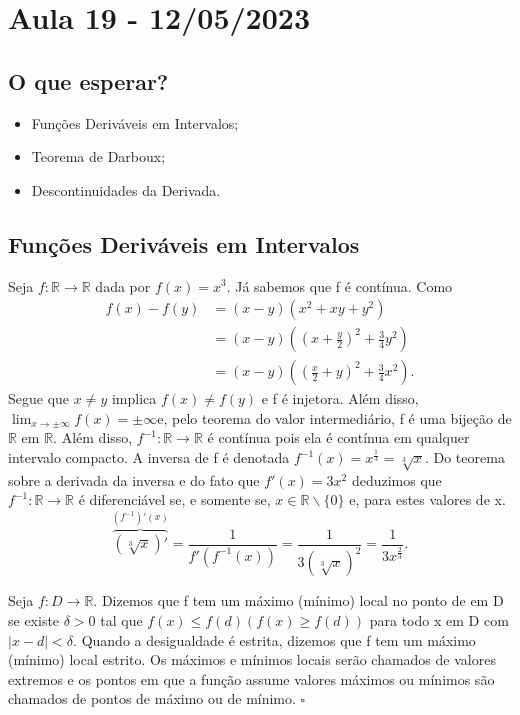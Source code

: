 \documentclass[Analysis/analysis_notes.tex]{subfiles}
\begin{document}
\section{Aula 19 - 12/05/2023}
\subsection{O que esperar?}
\begin{itemize}
	\item Fun\c cões Deriváveis em Intervalos;
	\item Teorema de Darboux;
	\item Descontinuidades da Derivada.
\end{itemize}

\subsection{Fun\c cões Deriváveis em Intervalos}
\begin{example}
	Seja \(f:\mathbb{R}\rightarrow \mathbb{R}\) dada por \(f(x) = x^{3}\). Já
	sabemos que f é contínua. Como
	\begin{align*}
		f(x) - f(y) & =(x-y)(x^{2}+xy+y^{2})                        \\
		            & =(x-y)((x+\frac{y}{2})^{2}+\frac{3}{4}y^{2})  \\
		            & =(x-y)((\frac{x}{2}+y)^{2}+\frac{3}{4}x^{2}).
	\end{align*}
	Segue que \(x\neq y\) implica \(f(x)\neq f(y)\) e f é injetora. Além disso,
	\(\lim_{x\to \pm\infty}f(x)=\pm\infty\)e, pelo teorema do valor intermediário,
	f é uma bije\c cão de \(\mathbb{R}\) em \(\mathbb{R}\). Além disso,
	\(f^{-1}:\mathbb{R}\rightarrow \mathbb{R}\) é contínua pois ela é contínua em
	qualquer intervalo compacto. A inversa de f é denotada \(f^{-1}(x) = x^{\frac{1}{3}} = \sqrt[3]{x}.\)
	Do teorema sobre a derivada da inversa e do fato que \(f'(x) = 3x^{2}\)
	deduzimos que \(f^{-1}:\mathbb{R}\rightarrow \mathbb{R}\) é diferenciável se,
	e somente se, \(x\in \mathbb{R}\backslash\{0\}\) e, para estes valores de x.
	\[
		\overbrace{(\sqrt[3]{x})'}^{(f^{-1})'(x)} = \frac{1}{f'(f^{-1}(x))} = \frac{1}{3(\sqrt[3]{x})^{2}} = \frac{1}{3x^{\frac{2}{3}}}.
	\]
\end{example}
\begin{def*}
	Seja \(f:D\rightarrow \mathbb{R}\). Dizemos que f tem um máximo (mínimo) local no
	ponto de em D se existe \(\delta >0\) tal que \(f(x)\leq f(d) (f(x)\geq f(d))\)
	para todo x em D com \(|x-d| < \delta .\) Quando a desigualdade é estrita,
	dizemos que f tem um máximo (mínimo) local estrito. Os máximos e mínimos locais
	serão chamados de valores extremos e os pontos em que a fun\c cão assume valores máximos
	ou mínimos são chamados de pontos de máximo ou de mínimo. \(\square\)
\end{def*}
\end{document}
